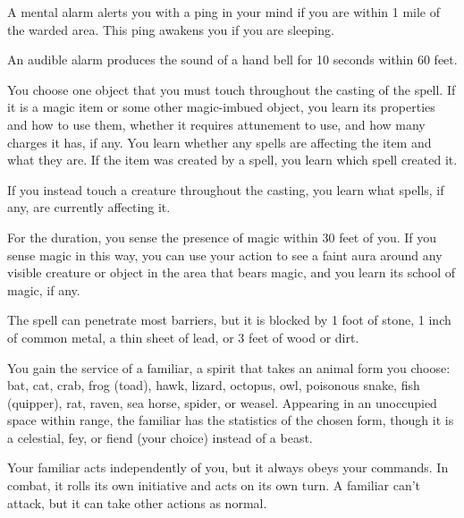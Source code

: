 \documentclass[letterpaper,twocolumn,openany,nodeprecatedcode,justified]{dndbook}
\begin{document}
A mental alarm alerts you with a ping in your mind if you are within 1 mile of the warded area. This ping awakens you if you are sleeping.

An audible alarm produces the sound of a hand bell for 10 seconds within 60 feet.


You choose one object that you must touch throughout the casting of the spell. If it is a magic item or some other magic-imbued object, you learn its properties and how to use them, whether it requires attunement to use, and how many charges it has, if any. You learn whether any spells are affecting the item and what they are. If the item was created by a spell, you learn which spell created it.

If you instead touch a creature throughout the casting, you learn what spells, if any, are currently affecting it.


For the duration, you sense the presence of magic within 30 feet of you. If you sense magic in this way, you can use your action to see a faint aura around any visible creature or object in the area that bears magic, and you learn its school of magic, if any.

The spell can penetrate most barriers, but it is blocked by 1 foot of stone, 1 inch of common metal, a thin sheet of lead, or 3 feet of wood or dirt.


You gain the service of a familiar, a spirit that takes an animal form you choose: bat, cat, crab, frog (toad), hawk, lizard, octopus, owl, poisonous snake, fish (quipper), rat, raven, sea horse, spider, or weasel. Appearing in an unoccupied space within range, the familiar has the statistics of the chosen form, though it is a celestial, fey, or fiend (your choice) instead of a beast.

Your familiar acts independently of you, but it always obeys your commands. In combat, it rolls its own initiative and acts on its own turn. A familiar can't attack, but it can take other actions as normal.
\end{document}
